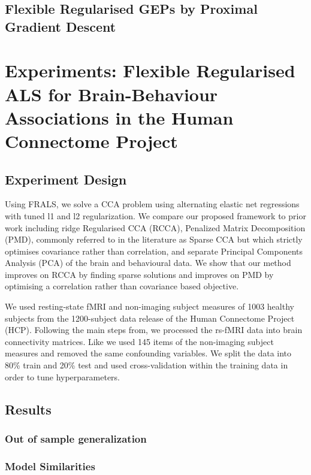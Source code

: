 \subsection{Flexible Regularised GEPs by Proximal Gradient Descent}

\section{Experiments: Flexible Regularised ALS for Brain-Behaviour Associations in the Human Connectome Project}

\subsection{Experiment Design}

Using FRALS, we solve a CCA problem using alternating elastic net regressions with tuned l1 and l2 regularization. We compare our proposed framework to prior work including ridge Regularised CCA (RCCA), Penalized Matrix Decomposition (PMD), commonly referred to in the literature as Sparse CCA but which strictly optimises covariance rather than correlation, and separate Principal Components Analysis (PCA) of the brain and behavioural data. We show that our method improves on RCCA by finding sparse solutions and improves on PMD by optimising a correlation rather than covariance based objective.

We used resting-state fMRI and non-imaging subject measures of 1003 healthy subjects from the 1200-subject data release of the Human Connectome Project (HCP). Following the main steps from\cite{smith2015positive}, we processed the rs-fMRI data into brain connectivity matrices. Like\cite{smith2015positive} we used 145 items of the non-imaging subject measures and removed the same confounding variables. We split the data into 80\% train and 20\% test and used cross-validation within the training data in order to tune hyperparameters.

\subsection{Results}

\subsubsection{Out of sample generalization}

\subsubsection{Model Similarities}

